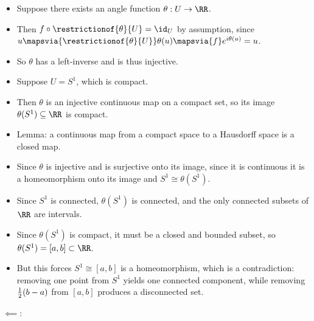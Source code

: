 \begin{itemize}
\tightlist
\item
  Suppose there exists an angle function \(\theta: U \to \RR\).
\item
  Then \(f\circ \restrictionof{\theta}{U} = \id_U\) by assumption, since
  \(u \mapsvia{\restrictionof{\theta}{U}} \theta(u) \mapsvia{f} e^{i\theta(u)} = u\).
\item
  So \(\theta\) has a left-inverse and is thus injective.
\item
  Suppose \(U = S^1\), which is compact.
\item
  Then \(\theta\) is an injective continuous map on a compact set, so
  its image \(\theta(S^1) \subseteq \RR\) is compact.
\item
  Lemma: a continuous map from a compact space to a Hausdorff space is a
  closed map.
\item
  Since \(\theta\) is injective and is surjective onto its image, since
  it is continuous it is a homeomorphism onto its image and
  \(S^1 \cong \theta(S^1)\).
\item
  Since \(S^1\) is connected, \(\theta(S^1)\) is connected, and the only
  connected subsets of \(\RR\) are intervals.
\item
  Since \(\theta(S^1)\) is compact, it must be a closed and bounded
  subset, so \(\theta(S^1) = [a, b] \subset \RR\).
\item
  But this forces \(S^1 \cong [a, b]\) is a homeomorphism, which is a
  contradiction: removing one point from \(S^1\) yields one connected
  component, while removing \({1\over 2}(b-a)\) from \([a, b]\) produces
  a disconnected set.
\end{itemize}

\(\impliedby\):


